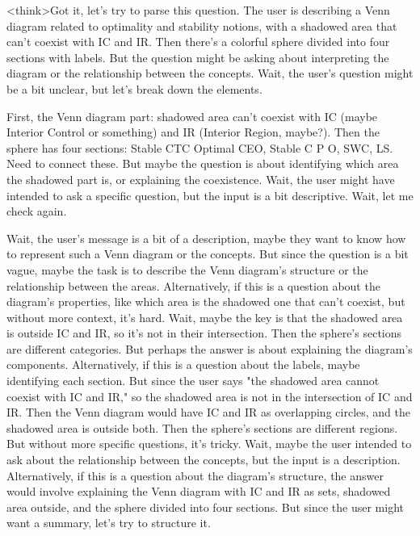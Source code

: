 <think>Got it, let's try to parse this question. The user is describing a Venn diagram related to optimality and stability notions, with a shadowed area that can't coexist with IC and IR. Then there's a colorful sphere divided into four sections with labels. But the question might be asking about interpreting the diagram or the relationship between the concepts. Wait, the user's question might be a bit unclear, but let's break down the elements.

First, the Venn diagram part: shadowed area can't coexist with IC (maybe Interior Control or something) and IR (Interior Region, maybe?). Then the sphere has four sections: Stable CTC Optimal CEO, Stable C P O, SWC, LS. Need to connect these. But maybe the question is about identifying which area the shadowed part is, or explaining the coexistence. Wait, the user might have intended to ask a specific question, but the input is a bit descriptive. Wait, let me check again.

Wait, the user's message is a bit of a description, maybe they want to know how to represent such a Venn diagram or the concepts. But since the question is a bit vague, maybe the task is to describe the Venn diagram's structure or the relationship between the areas. Alternatively, if this is a question about the diagram's properties, like which area is the shadowed one that can't coexist, but without more context, it's hard. Wait, maybe the key is that the shadowed area is outside IC and IR, so it's not in their intersection. Then the sphere's sections are different categories. But perhaps the answer is about explaining the diagram's components. Alternatively, if this is a question about the labels, maybe identifying each section. But since the user says "the shadowed area cannot coexist with IC and IR," so the shadowed area is not in the intersection of IC and IR. Then the Venn diagram would have IC and IR as overlapping circles, and the shadowed area is outside both. Then the sphere's sections are different regions. But without more specific questions, it's tricky. Wait, maybe the user intended to ask about the relationship between the concepts, but the input is a description. Alternatively, if this is a question about the diagram's structure, the answer would involve explaining the Venn diagram with IC and IR as sets, shadowed area outside, and the sphere divided into four sections. But since the user might want a summary, let's try to structure it.


